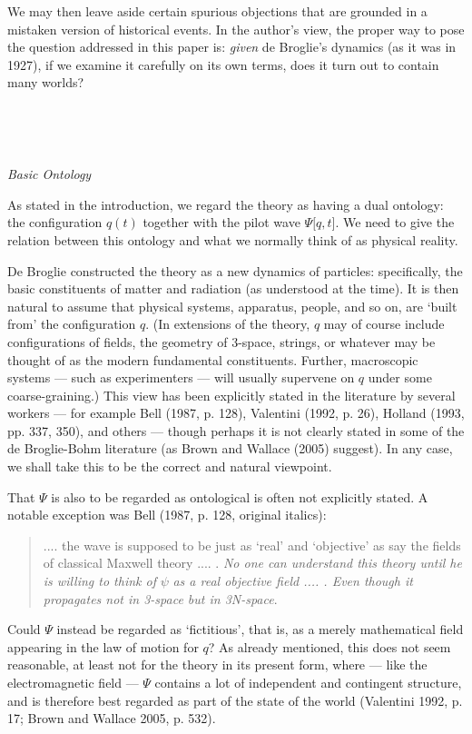 \documentclass[12pt]{article}%
\begin{document}
We may then leave aside certain spurious objections that are grounded in a
mistaken version of historical events. In the author's view, the proper way to
pose the question addressed in this paper is: \textit{given} de Broglie's
dynamics (as it was in 1927), if we examine it carefully on its own terms,
does it turn out to contain many worlds?

\ 

$\ $

\begin{center}
\textit{Basic Ontology}
\end{center}

As stated in the introduction, we regard the theory as having a dual ontology:
the configuration $q(t)$ together with the pilot wave $\Psi\lbrack q,t]$. We
need to give the relation between this ontology and what we normally think of
as physical reality.

De Broglie constructed the theory as a new dynamics of particles:
specifically, the basic constituents of matter and radiation (as understood at
the time). It is then natural to assume that physical systems, apparatus,
people, and so on, are `built from' the configuration $q$. (In extensions of
the theory, $q$ may of course include configurations of fields, the geometry
of 3-space, strings, or whatever may be thought of as the modern fundamental
constituents. Further, macroscopic systems --- such as experimenters --- will
usually supervene on $q$ under some coarse-graining.) This view has been
explicitly stated in the literature by several workers --- for example Bell
(1987, p. 128), Valentini (1992, p. 26), Holland (1993, pp. 337, 350), and
others --- though perhaps it is not clearly stated in some of the de
Broglie-Bohm literature (as Brown and Wallace (2005) suggest). In any case, we
shall take this to be the correct and natural viewpoint.

That $\Psi$ is also to be regarded as ontological is often not explicitly
stated. A notable exception was Bell (1987, p. 128, original italics):

\begin{quote}
.... the wave is supposed to be just as `real' and `objective' as say the
fields of classical Maxwell theory .... . \textit{No one can understand this
theory until he is willing to think of }$\psi$\textit{ as a real objective
field .... . Even though it propagates not in 3-space but in 3N-space}.
\end{quote}

Could $\Psi$ instead be regarded as `fictitious', that is, as a merely
mathematical field appearing in the law of motion for $q$? As already
mentioned, this does not seem reasonable, at least not for the theory in its
present form, where --- like the electromagnetic field --- $\Psi$ contains a
lot of independent and contingent structure, and is therefore best regarded as
part of the state of the world (Valentini 1992, p. 17; Brown and Wallace 2005,
p. 532).
\end{document}
